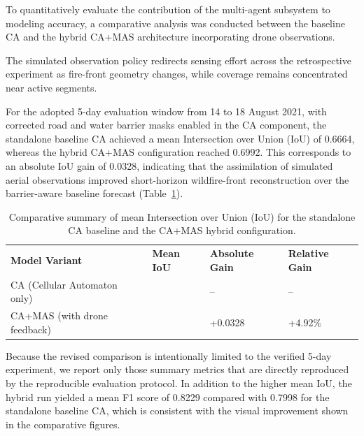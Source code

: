 \documentclass[10pt,letterpaper]{article}
\begin{document}
To quantitatively evaluate the contribution of the multi-agent subsystem
to modeling accuracy, a comparative analysis was conducted between the
baseline CA and the hybrid CA+MAS architecture incorporating drone
observations.

The simulated observation policy redirects sensing effort across the
retrospective experiment as fire-front geometry changes, while coverage
remains concentrated near active segments.

For the adopted 5-day evaluation window from 14 to 18 August 2021, with
corrected road and water barrier masks enabled in the CA component, the
standalone baseline CA achieved a mean Intersection over Union (IoU) of
0.6664, whereas the hybrid CA+MAS configuration reached 0.6992. This
corresponds to an absolute IoU gain of 0.0328, indicating that the
assimilation of simulated aerial observations improved short-horizon
wildfire-front reconstruction over the barrier-aware baseline forecast
(Table~\ref{tab:summary_metrics}).

{%
\begin{longtable}[]{@{}
  >{\centering\arraybackslash}p{}
  >{\centering\arraybackslash}p{}
  >{\centering\arraybackslash}p{}
  >{\centering\arraybackslash}p{}@{}}
\caption{Comparative summary of mean Intersection over Union (IoU) for the standalone CA baseline and the CA+MAS hybrid configuration.}\label{tab:summary_metrics}\\
\toprule\noalign{}
\endhead
\bottomrule\noalign{}
\endlastfoot
\textbf{Model Variant} & \textbf{Mean IoU} & \textbf{Absolute Gain} &
\textbf{Relative Gain} \\
CA (Cellular Automaton only) & 0.6664 & -- & -- \\
CA+MAS (with drone feedback) & 0.6992 & +0.0328 & +4.92\% \\
\end{longtable}
}

Because the revised comparison is intentionally limited to the verified
5-day experiment, we report only those summary metrics that are directly
reproduced by the reproducible evaluation protocol. In addition to the higher
mean IoU, the hybrid run yielded a mean F1 score of 0.8229 compared with
0.7998 for the standalone baseline CA, which is consistent with the
visual improvement shown in the comparative figures.
\end{document}
